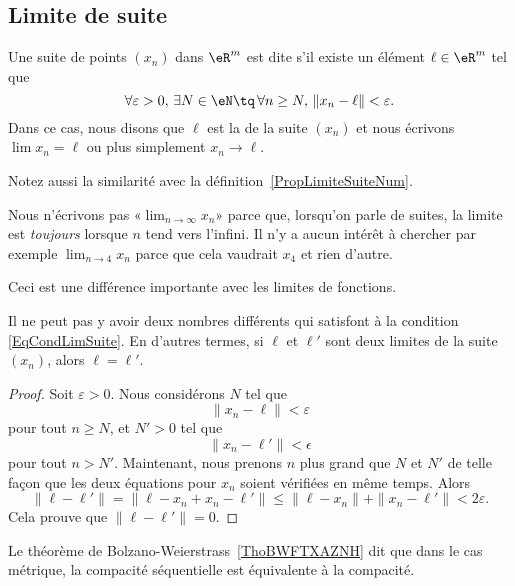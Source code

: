 \subsection{Limite de suite}

\begin{definition}
	Une suite de points $(x_n)$ dans $\eR^m$ est dite  s'il existe un élément $\ell\in\eR^m$ tel que
	\begin{equation}	\label{EqCondLimSuite}
		\forall\varepsilon>0,\,\exists N\in \eN\tq\,\forall n\geq N,\,\| x_n-\ell \|<\varepsilon.
	\end{equation}
	Dans ce cas, nous disons que $\ell$ est la  de la suite $(x_n)$ et nous écrivons $\lim x_n=\ell$ ou plus simplement $x_n\to \ell$.
\end{definition}
Notez aussi la similarité avec la définition~\ref{PropLimiteSuiteNum}.

\begin{remark}
	Nous n'écrivons pas «$\lim_{n\to\infty}x_n$» parce que, lorsqu'on parle de suites, la limite est \emph{toujours} lorsque $n$ tend vers l'infini. Il n'y a aucun intérêt à chercher par exemple $\lim_{n\to 4}x_n$ parce que cela vaudrait $x_4$ et rien d'autre.

	Ceci est une différence importante avec les limites de fonctions.
\end{remark}

\begin{lemma}
	Il ne peut pas y avoir deux nombres différents qui satisfont à la condition \eqref{EqCondLimSuite}. En d'autres termes, si $\ell$ et $\ell'$ sont deux limites de la suite $(x_n)$, alors $\ell=\ell'$.
\end{lemma}

\begin{proof}
	Soit $\varepsilon>0$. Nous considérons $N$ tel que
	\begin{equation}
		\| x_n-\ell \|<\varepsilon
	\end{equation}
	pour tout $n\geq N$, et $N'>0$ tel que
	\begin{equation}
		\| x_n-\ell' \|<\epsilon
	\end{equation}
	pour tout $n>N'$. Maintenant, nous prenons $n$ plus grand que $N$ et $N'$ de telle façon que les deux équations pour $x_n$ soient vérifiées en même temps. Alors
	\begin{equation}
		\| \ell-\ell' \|=\| \ell-x_n+x_n-\ell' \|\leq\| \ell-x_n \|+\| x_n-\ell' \|<2\varepsilon.
	\end{equation}
	Cela prouve que $\| \ell-\ell' \|=0$.
\end{proof}
Le théorème de Bolzano-Weierstrass~\ref{ThoBWFTXAZNH} dit que dans le cas métrique, la compacité séquentielle est équivalente à la compacité.

